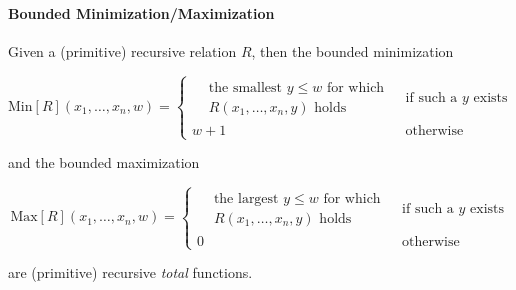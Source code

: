 \paragraph{Bounded Minimization/Maximization}

Given a (primitive) recursive relation $R$, then the bounded minimization

$$
\mathrm{Min}[R](x_1, \ldots, x_n, w) =
\begin{cases}
    \begin{aligned}
      &\textrm{the smallest } y \leq w \textrm{ for which } \\
      &R(x_1, \ldots, x_n, y) \textrm{ holds}
    \end{aligned}
    & \textrm{if such a } y \textrm{ exists} \\
    w + 1 & \textrm{otherwise}
\end{cases}
$$

and the bounded maximization

$$
\mathrm{Max}[R](x_1, \ldots, x_n, w) = 
\begin{cases}
    \begin{aligned}
      &\textrm{the largest } y \leq w \textrm{ for which } \\
      &R(x_1, \ldots, x_n, y) \textrm{ holds}
    \end{aligned}
    & \textrm{if such a } y \textrm{ exists} \\
    0 & \textrm{otherwise}
\end{cases}
$$

are (primitive) recursive \textit{total} functions.

